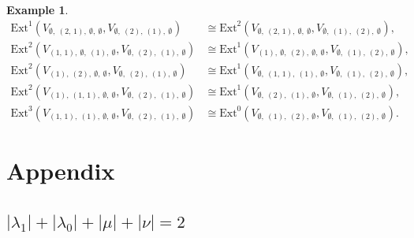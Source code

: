 \documentclass[openany, a4paper]{amsbook}
\theoremstyle{definition}
\newtheorem{exmp}[thm]{Example}
\numberwithin{equation}{chapter}
\newcommand{\Ext}[4]{\mathrm{Ext}^{#1}_{#2}({#3}, {#4})}
\begin{document}
\begin{exmp}
\begin{align*}
        \Ext{1}{}{V_{\emptyset, \ (2,\,1), \ \emptyset, \ \emptyset }}{V_{\emptyset, \ (2), \ (1), \ \emptyset }} 
        & \cong 
        \Ext{2}{}{V_{\emptyset, \ (2,\,1), \ \emptyset, \ \emptyset }}{V_{\emptyset, \ (1), \ (2), \ \emptyset }},\\
        \Ext{2}{}{V_{ (1,\,1), \ \emptyset, \ (1), \ \emptyset }}{V_{\emptyset, \ (2), \ (1), \ \emptyset }} 
        & \cong 
        \Ext{1}{}{V_{(1), \ \emptyset, \ (2), \ \emptyset , \ \emptyset }}{V_{\emptyset, \ (1), \ (2), \ \emptyset }},\\
        \Ext{2}{}{V_{ (1), \ (2), \ \emptyset, \ \emptyset }}{V_{\emptyset, \ (2), \ (1), \ \emptyset }} 
        & \cong 
        \Ext{1}{}{V_{ \emptyset, \ (1,\,1), \ (1), \ \emptyset }}{V_{\emptyset, \ (1), \ (2), \ \emptyset }},\\
        \Ext{2}{}{V_{ (1), \ (1,\,1), \ \emptyset, \ \emptyset }}{V_{\emptyset, \ (2), \ (1), \ \emptyset }} 
        & \cong 
        \Ext{1}{}{V_{ \emptyset, \ (2), \ (1), \ \emptyset }}{V_{\emptyset, \ (1), \ (2), \ \emptyset }},\\
        \Ext{3}{}{V_{(1,\,1), \ (1), \ \emptyset, \ \emptyset }}{V_{ \emptyset, \ (2), \ (1), \ \emptyset }} & \cong 
        \Ext{0}{}{V_{\emptyset, \ (1), \ (2), \ \emptyset }} {V_{\emptyset, \ (1), \ (2), \ \emptyset }}.
    \end{align*}
\end{exmp}


\appendix
% 
\chapter*{Appendix}  \label{chap:Appendix}
\allowdisplaybreaks
\section{$ |\lambda_1| + |\lambda_0| + |\mu| + |\nu| = 2$}

$\quad$
\end{document}

